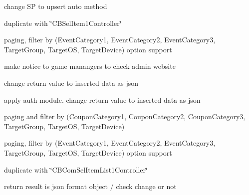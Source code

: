 
\begin{DoxyRefList}
\item[\label{a00001__todo000001}%
\hypertarget{a00001__todo000001}{}%
File \hyperlink{a00198}{C\+B\+Add\+Member\+Item\+Purchase\+Controller.cs} ]change SP to upsert auto method  
\item[\label{a00001__todo000002}%
\hypertarget{a00001__todo000002}{}%
File \hyperlink{a00201}{C\+B\+Com\+Sel\+Item\+List1\+Controller.cs} ]duplicate with \char`\"{}\+C\+B\+Sel\+Item1\+Controller\char`\"{}  
\item[\label{a00001__todo000003}%
\hypertarget{a00001__todo000003}{}%
File \hyperlink{a00203}{C\+B\+Com\+Sel\+Member\+Game\+Infoes\+Controller.cs} ]paging, filter by (Event\+Category1, Event\+Category2, Event\+Category3, Target\+Group, Target\+OS, Target\+Device) option support  
\item[\label{a00001__todo000004}%
\hypertarget{a00001__todo000004}{}%
File \hyperlink{a00213}{C\+B\+Com\+Udt\+Member\+Item\+Purchase\+Controller.cs} ]make notice to game manangers to check admin website  
\item[\label{a00001__todo000005}%
\hypertarget{a00001__todo000005}{}%
File \hyperlink{a00214}{C\+B\+Ins\+Anonymous\+Reg\+Member\+Controller.cs} ]change return value to inserted data as json  
\item[\label{a00001__todo000006}%
\hypertarget{a00001__todo000006}{}%
File \hyperlink{a00215}{C\+B\+Ins\+Reg\+Member\+Controller.cs} ]apply auth module. change return value to inserted data as json  
\item[\label{a00001__todo000007}%
\hypertarget{a00001__todo000007}{}%
File \hyperlink{a00216}{C\+B\+Sel\+Coupons\+Controller.cs} ]paging and filter by (Coupon\+Category1, Coupon\+Category2, Coupon\+Category3, Target\+Group, Target\+OS, Target\+Device)  
\item[\label{a00001__todo000008}%
\hypertarget{a00001__todo000008}{}%
File \hyperlink{a00217}{C\+B\+Sel\+Game\+Events\+Controller.cs} ]paging, filter by (Event\+Category1, Event\+Category2, Event\+Category3, Target\+Group, Target\+OS, Target\+Device) option support  
\item[\label{a00001__todo000009}%
\hypertarget{a00001__todo000009}{}%
File \hyperlink{a00219}{C\+B\+Sel\+Item1\+Controller.cs} ]duplicate with \char`\"{}\+C\+B\+Com\+Sel\+Item\+List1\+Controller\char`\"{}  
\item[\label{a00001__todo000010}%
\hypertarget{a00001__todo000010}{}%
File \hyperlink{a00221}{C\+B\+Sel\+Login\+I\+D\+Dupe\+Check\+Controller.cs} ]return result is json format object / check change or not  

\end{DoxyRefList}

